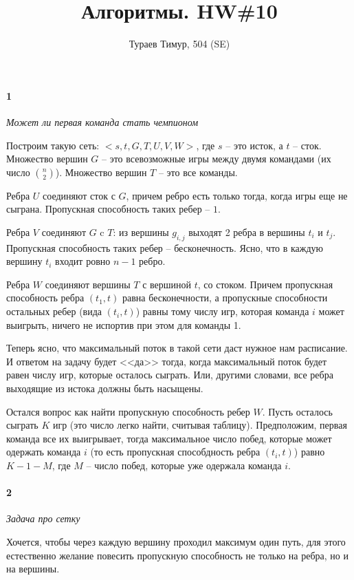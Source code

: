 \documentclass[russian]{article}
\begin{document}
\title{Алгоритмы. HW\#10}
\author{Тураев Тимур, 504 (SE)}
\maketitle

\paragraph*{1}

\textit{Может ли первая команда стать чемпионом}

Построим такую сеть: $<s, t, G, T, U, V, W>$, где $s$ -- это исток, а $t$ -- сток. Множество вершин $G$ -- это всевозможные игры между двумя командами (их число $\binom{n}{2}$). Множество вершин $T$ -- это все команды. 

Ребра $U$ соединяют сток с $G$, причем ребро есть только тогда, когда игры еще не сыграна. Пропускная способность таких ребер -- $1$.

Ребра $V$ соединяют $G$ c $T$: из вершины $g_{i,j}$ выходят 2 ребра в вершины $t_i$ и $t_j$. Пропускная способность таких ребер -- бесконечность. Ясно, что в каждую вершину $t_i$ входит ровно $n-1$ ребро.

Ребра $W$ соединяют вершины $T$ с вершиной $t$, со стоком. Причем пропускная способность ребра $(t_1, t)$ равна бесконечности, а пропускные способности остальных ребер (вида $(t_i, t)$) равны тому числу игр, которая команда $i$ может выигрыть, ничего не испортив при этом для команды 1.

Теперь ясно, что максимальный поток в такой сети даст нужное нам расписание. И ответом на задачу будет <<да>> тогда, когда максимальный поток будет равен числу игр, которые осталось сыграть. Или, другими словами, все ребра выходящие из истока должны быть насыщены.

Остался вопрос как найти пропускную способность ребер $W$. Пусть осталось сыграть $K$ игр (это число легко найти, считывая таблицу). Предположим, первая команда все их выигрывает, тогда максимальное число побед, которые может одержать команда $i$ (то есть пропускная способдность ребра $(t_i, t)$) равно $K - 1 - M$, где $M$ -- число побед, которые уже одержала команда $i$.

\paragraph*{2}

\textit{Задача про сетку}

Хочется, чтобы через каждую вершину проходил максимум один путь, для этого естественно желание повесить пропускную способность не только на ребра, но и на вершины.
\end{document}
